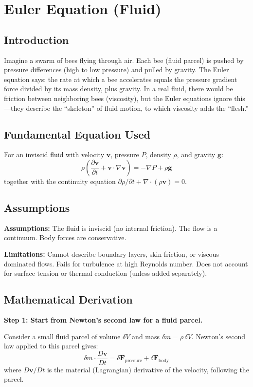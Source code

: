 \chapter{Euler Equation (Fluid)}

\section*{Introduction}

Imagine a swarm of bees flying through air. Each bee (fluid parcel) is pushed by pressure differences (high to low pressure) and pulled by gravity. The Euler equation says: the rate at which a bee accelerates equals the pressure gradient force divided by its mass density, plus gravity. In a real fluid, there would be friction between neighboring bees (viscosity), but the Euler equations ignore this---they describe the ``skeleton'' of fluid motion, to which viscosity adds the ``flesh.''
\section*{Fundamental Equation Used}

For an inviscid fluid with velocity $\mathbf{v}$, pressure $P$, density $\rho$, and gravity $\mathbf{g}$:
\[
\rho\left(\frac{\partial \mathbf{v}}{\partial t} + \mathbf{v} \cdot \nabla \mathbf{v}\right) = -\nabla P + \rho \mathbf{g}
\]
together with the continuity equation $\partial \rho / \partial t + \nabla \cdot (\rho \mathbf{v}) = 0$.
\section*{Assumptions}

\textbf{Assumptions:} The fluid is inviscid (no internal friction). The flow is a continuum. Body forces are conservative.


\textbf{Limitations:} Cannot describe boundary layers, skin friction, or viscous-dominated flows. Fails for turbulence at high Reynolds number. Does not account for surface tension or thermal conduction (unless added separately).


\section*{Mathematical Derivation}

\textbf{Step 1: Start from Newton's second law for a fluid parcel.}

Consider a small fluid parcel of volume $\delta V$ and mass $\delta m = \rho\,\delta V$. Newton's second law applied to this parcel gives:
\begin{equation}
\delta m \cdot \frac{D\mathbf{v}}{Dt} = \delta\mathbf{F}_{\text{pressure}} + \delta\mathbf{F}_{\text{body}}
\end{equation}
where $D\mathbf{v}/Dt$ is the material (Lagrangian) derivative of the velocity, following the parcel.

